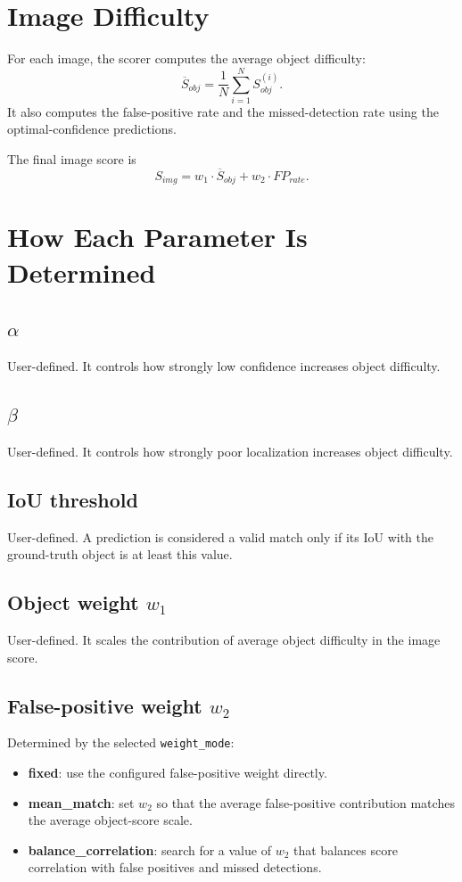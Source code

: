 \documentclass[11pt]{article}
\begin{document}
\section{Image Difficulty}
For each image, the scorer computes the average object difficulty:
\[
\overline{S}_{obj} = \frac{1}{N} \sum_{i=1}^{N} S_{obj}^{(i)}.
\]
It also computes the false-positive rate and the missed-detection rate using the optimal-confidence predictions.

The final image score is
\[
S_{img} = w_1 \cdot \overline{S}_{obj} + w_2 \cdot FP_{rate}.
\]

\section{How Each Parameter Is Determined}
\subsection*{\(\alpha\)}
User-defined. It controls how strongly low confidence increases object difficulty.

\subsection*{\(\beta\)}
User-defined. It controls how strongly poor localization increases object difficulty.

\subsection*{IoU threshold}
User-defined. A prediction is considered a valid match only if its IoU with the ground-truth object is at least this value.

\subsection*{Object weight \(w_1\)}
User-defined. It scales the contribution of average object difficulty in the image score.

\subsection*{False-positive weight \(w_2\)}
Determined by the selected \texttt{weight\_mode}:
\begin{itemize}
	\item \textbf{fixed}: use the configured false-positive weight directly.
	\item \textbf{mean\_match}: set \(w_2\) so that the average false-positive contribution matches the average object-score scale.
	\item \textbf{balance\_correlation}: search for a value of \(w_2\) that balances score correlation with false positives and missed detections.
\end{itemize}
\end{document}

